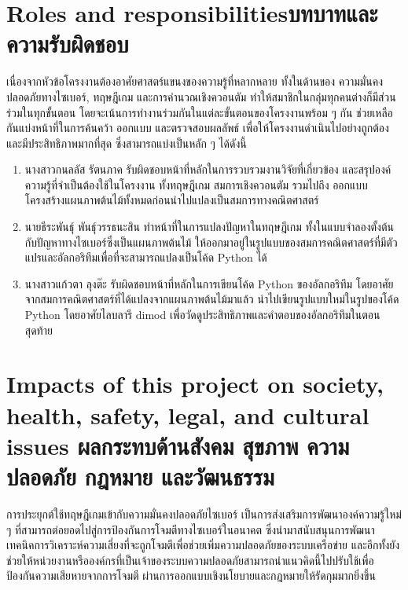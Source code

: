 \section{\ifenglish Roles and responsibilities\else บทบาทและความรับผิดชอบ\fi}

เนื่องจากหัวข้อโครงงานต้องอาศัยศาสตร์แขนงของความรู้ที่หลากหลาย ทั้งในด้านของ ความมั่นคงปลอดภัยทางไซเบอร์, ทฤษฎีเกม และการคำนวณเชิงควอนตัม ทำให้สมาชิกในกลุ่มทุกคนต่างก็มีส่วนร่วมในทุกขั้นตอน โดยจะเน้นการทำงานร่วมกันในแต่ละขั้นตอนของโครงงานพร้อม ๆ กัน ช่วยเหลือกันแบ่งหน้าที่ในการค้นคว้า ออกแบบ และตรวจสอบผลลัพธ์ เพื่อให้โครงงานดำเนินไปอย่างถูกต้องและมีประสิทธิภาพมากที่สุด ซึ่งสามารถแบ่งเป็นหลัก ๆ ได้ดังนี้
\begin{enumerate}
\item นางสาวกนลลัส รัตนภาค รับผิดชอบหน้าที่หลักในการรวบรวมงานวิจัยที่เกี่ยวข้อง และสรุปองค์ความรู้ที่จำเป็นต้องใช้ในโครงงาน ทั้งทฤษฎีเกม สมการเชิงควอนตัม รวมไปถึง ออกแบบโครงสร้างแผนภาพต้นไม้ทั้งหมดก่อนนำไปแปลงเป็นสมการทางคณิตศาสตร์

\item นายธีระพันธุ์ พันธุ์วรรธนะสิน ทำหน้าที่ในการแปลงปัญหาในทฤษฎีเกม ทั้งในแบบจำลองตั้งต้นกับปัญหาทางไซเบอร์ซึ่งเป็นแผนภาพต้นไม้ ให้ออกมาอยู่ในรูปแบบของสมการคณิตศาสตร์ที่มีตัวแปรและอัลกอริทึมเพื่อที่จะสามารถแปลงเป็นโค้ด Python ได้
\item นางสาวแก้วตา ลุงต๊ะ รับผิดชอบหน้าที่หลักในการเขียนโค้ด Python ของอัลกอริทึม โดยอาศัยจากสมการคณิตศาสตร์ที่ได้แปลงจากแผนภาพต้นไม้มาแล้ว นำไปเขียนรูปแบบใหม่ในรูปของโค้ด Python โดยอาศัยไลบลารี dimod เพื่อวัดดูประสิทธิภาพและคำตอบของอัลกอริทึมในตอนสุดท้าย
\end{enumerate}

\section{\ifenglish%
Impacts of this project on society, health, safety, legal, and cultural issues
\else%
ผลกระทบด้านสังคม สุขภาพ ความปลอดภัย กฎหมาย และวัฒนธรรม
\fi}

การประยุกต์ใช้ทฤษฎีเกมเข้ากับความมั่นคงปลอดภัยไซเบอร์ เป็นการส่งเสริมการพัฒนาองค์ความรู้ใหม่ ๆ ที่สามารถต่อยอดไปสู่การป้องกันการโจมตีทางไซเบอร์ในอนาคต ซึ่งนำมาสนับสนุนการพัฒนาเทคนิคการวิเคราะห์ความเสี่ยงที่จะถูกโจมตีเพื่อช่วยเพิ่มความปลอดภัยของระบบเครือข่าย และอีกทั้งยังช่วยให้หน่วยงานหรือองค์กรที่เป็นเจ้าของระบบความปลอดภัยสามารถนำแนวคิดนี้ไปปรับใช้เพื่อป้องกันความเสียหายจากการโจมตี ผ่านการออกแบบเชิงนโยบายและกฎหมายให้รัดกุมมากยิ่งขึ้น

